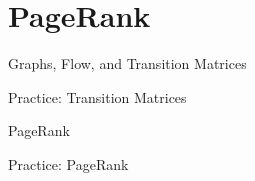 \section{PageRank}

\begin{frame}{Graphs, Flow, and Transition Matrices}

\end{frame}

\begin{frame}{Practice: Transition Matrices}

\end{frame}

\begin{frame}{PageRank}

\end{frame}

\begin{frame}{Practice: PageRank}

\end{frame}


